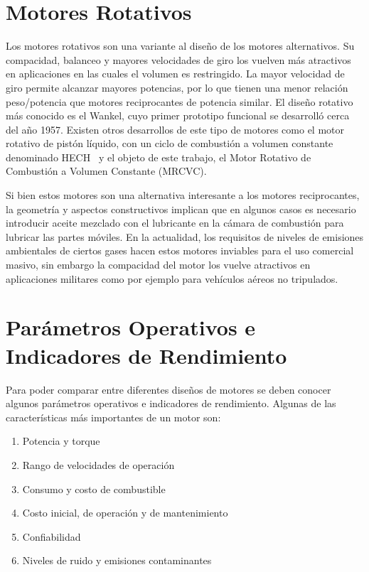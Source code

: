 
\section{Motores Rotativos}
%
Los motores rotativos son una variante al diseño de los motores alternativos.
%
Su compacidad, balanceo y mayores velocidades de giro los vuelven más atractivos
en aplicaciones en las cuales el volumen es restringido.
%
La mayor velocidad de giro permite alcanzar mayores potencias, por lo que tienen
una menor relación peso/potencia que motores reciprocantes de potencia similar.
%
El diseño rotativo más conocido es el Wankel, cuyo primer prototipo funcional se
desarrolló cerca del año 1957.
%
Existen otros desarrollos de este tipo de motores como el motor rotativo de
pistón líquido, con un ciclo de combustión a volumen constante denominado
HECH~\parencite{hehc_05} y el objeto de este trabajo, el Motor Rotativo de
Combustión a Volumen Constante (MRCVC).

Si bien estos motores son una alternativa interesante a los motores
reciprocantes, la geometría y aspectos constructivos implican que en algunos
casos es necesario introducir aceite mezclado con el lubricante en la cámara de
combustión para lubricar las partes móviles.
%
%
En la actualidad, los requisitos de niveles de emisiones ambientales de ciertos
gases hacen estos motores inviables para el uso comercial masivo, sin embargo la
compacidad del motor los vuelve atractivos en aplicaciones militares como por
ejemplo para vehículos aéreos no tripulados.



\section{Parámetros Operativos e Indicadores de Rendimiento}
%
Para poder comparar entre diferentes diseños de motores se deben conocer algunos
parámetros operativos e indicadores de rendimiento.
%
Algunas de las características más importantes de un motor son:
%
\begin{enumerate}
    \item Potencia y torque
    \item Rango de velocidades de operación
    \item Consumo y costo de combustible
    \item Costo inicial, de operación y de mantenimiento
    \item Confiabilidad
    \item Niveles de ruido y emisiones contaminantes
\end{enumerate}

